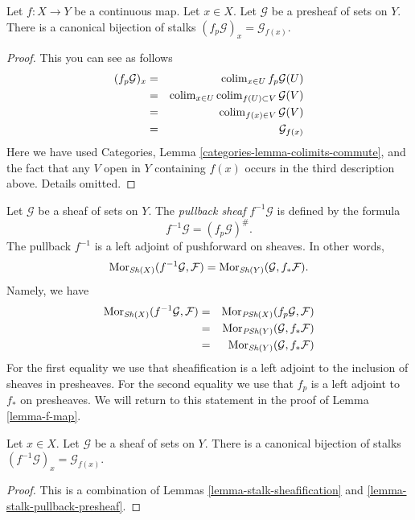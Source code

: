 \begin{lemma}
\label{lemma-stalk-pullback-presheaf}
Let $f : X \to Y$ be a continuous map.
Let $x \in X$. Let $\mathcal{G}$ be a presheaf of sets on $Y$.
There is a canonical bijection of stalks
$(f_p\mathcal{G})_x = \mathcal{G}_{f(x)}$.
\end{lemma}

\begin{proof}
This you can see as follows
\begin{eqnarray*}
(f_p\mathcal{G})_x
& = &
\mathop{\mathrm{colim}}\nolimits_{x \in U} f_p\mathcal{G}(U) \\
& = &
\mathop{\mathrm{colim}}\nolimits_{x \in U} \mathop{\mathrm{colim}}\nolimits_{f(U) \subset V} \mathcal{G}(V) \\
& = &
\mathop{\mathrm{colim}}\nolimits_{f(x) \in V} \mathcal{G}(V) \\
& = &
\mathcal{G}_{f(x)}
\end{eqnarray*}
Here we have used
Categories, Lemma \ref{categories-lemma-colimits-commute},
and the fact that any $V$ open in $Y$ containing $f(x)$
occurs in the third description above. Details omitted.
\end{proof}

\noindent
Let $\mathcal{G}$ be a sheaf of sets on $Y$.
The {\it pullback sheaf} $f^{-1}\mathcal{G}$ is defined
by the formula
$$
f^{-1}\mathcal{G} = (f_p\mathcal{G})^\# .
$$
The pullback $f^{-1}$ is a left adjoint of
pushforward on sheaves. In other words,
$$
\mathop{\mathrm{Mor}}\nolimits_{\mathop{\mathit{Sh}}\nolimits(X)}(f^{-1}\mathcal{G}, \mathcal{F})
=
\mathop{\mathrm{Mor}}\nolimits_{\mathop{\mathit{Sh}}\nolimits(Y)}(\mathcal{G}, f_*\mathcal{F}).
$$
Namely, we have
\begin{eqnarray*}
\mathop{\mathrm{Mor}}\nolimits_{\mathop{\mathit{Sh}}\nolimits(X)}(f^{-1}\mathcal{G}, \mathcal{F})
& = &
\mathop{\mathrm{Mor}}\nolimits_{\textit{PSh}(X)}(f_p\mathcal{G}, \mathcal{F}) \\
& = &
\mathop{\mathrm{Mor}}\nolimits_{\textit{PSh}(Y)}(\mathcal{G}, f_*\mathcal{F}) \\
& = &
\mathop{\mathrm{Mor}}\nolimits_{\mathop{\mathit{Sh}}\nolimits(Y)}(\mathcal{G}, f_*\mathcal{F})
\end{eqnarray*}
For the first equality we use that sheafification is a left adjoint
to the inclusion of sheaves in presheaves. For the second equality
we use that $f_p$ is a left adjoint to $f_*$ on presheaves. We will return
to this statement in the proof of Lemma \ref{lemma-f-map}.

\begin{lemma}
\label{lemma-stalk-pullback}
Let $x \in X$. Let $\mathcal{G}$ be a sheaf of sets on $Y$.
There is a canonical bijection of stalks
$(f^{-1}\mathcal{G})_x = \mathcal{G}_{f(x)}$.
\end{lemma}

\begin{proof}
This is a combination of Lemmas \ref{lemma-stalk-sheafification}
and \ref{lemma-stalk-pullback-presheaf}.
\end{proof}

